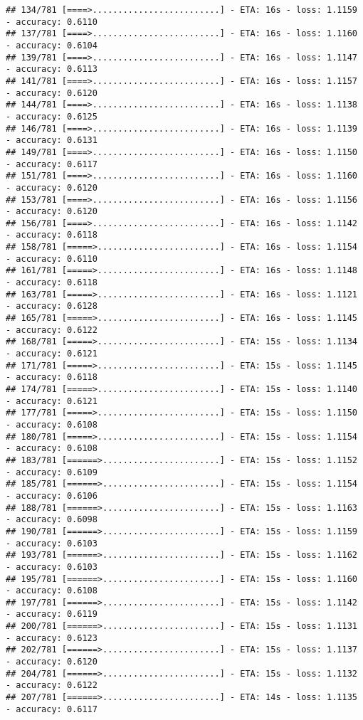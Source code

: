 \documentclass[
]{article}
\begin{document}
\begin{verbatim}
## 134/781 [====>.........................] - ETA: 16s - loss: 1.1159 - accuracy: 0.6110
## 137/781 [====>.........................] - ETA: 16s - loss: 1.1160 - accuracy: 0.6104
## 139/781 [====>.........................] - ETA: 16s - loss: 1.1147 - accuracy: 0.6113
## 141/781 [====>.........................] - ETA: 16s - loss: 1.1157 - accuracy: 0.6120
## 144/781 [====>.........................] - ETA: 16s - loss: 1.1138 - accuracy: 0.6125
## 146/781 [====>.........................] - ETA: 16s - loss: 1.1139 - accuracy: 0.6131
## 149/781 [====>.........................] - ETA: 16s - loss: 1.1150 - accuracy: 0.6117
## 151/781 [====>.........................] - ETA: 16s - loss: 1.1160 - accuracy: 0.6120
## 153/781 [====>.........................] - ETA: 16s - loss: 1.1156 - accuracy: 0.6120
## 156/781 [====>.........................] - ETA: 16s - loss: 1.1142 - accuracy: 0.6118
## 158/781 [=====>........................] - ETA: 16s - loss: 1.1154 - accuracy: 0.6110
## 161/781 [=====>........................] - ETA: 16s - loss: 1.1148 - accuracy: 0.6118
## 163/781 [=====>........................] - ETA: 16s - loss: 1.1121 - accuracy: 0.6128
## 165/781 [=====>........................] - ETA: 16s - loss: 1.1145 - accuracy: 0.6122
## 168/781 [=====>........................] - ETA: 15s - loss: 1.1134 - accuracy: 0.6121
## 171/781 [=====>........................] - ETA: 15s - loss: 1.1145 - accuracy: 0.6118
## 174/781 [=====>........................] - ETA: 15s - loss: 1.1140 - accuracy: 0.6121
## 177/781 [=====>........................] - ETA: 15s - loss: 1.1150 - accuracy: 0.6108
## 180/781 [=====>........................] - ETA: 15s - loss: 1.1154 - accuracy: 0.6108
## 183/781 [======>.......................] - ETA: 15s - loss: 1.1152 - accuracy: 0.6109
## 185/781 [======>.......................] - ETA: 15s - loss: 1.1154 - accuracy: 0.6106
## 188/781 [======>.......................] - ETA: 15s - loss: 1.1163 - accuracy: 0.6098
## 190/781 [======>.......................] - ETA: 15s - loss: 1.1159 - accuracy: 0.6103
## 193/781 [======>.......................] - ETA: 15s - loss: 1.1162 - accuracy: 0.6103
## 195/781 [======>.......................] - ETA: 15s - loss: 1.1160 - accuracy: 0.6108
## 197/781 [======>.......................] - ETA: 15s - loss: 1.1142 - accuracy: 0.6119
## 200/781 [======>.......................] - ETA: 15s - loss: 1.1131 - accuracy: 0.6123
## 202/781 [======>.......................] - ETA: 15s - loss: 1.1137 - accuracy: 0.6120
## 204/781 [======>.......................] - ETA: 15s - loss: 1.1132 - accuracy: 0.6122
## 207/781 [======>.......................] - ETA: 14s - loss: 1.1135 - accuracy: 0.6117

\end{verbatim}
\end{document}
